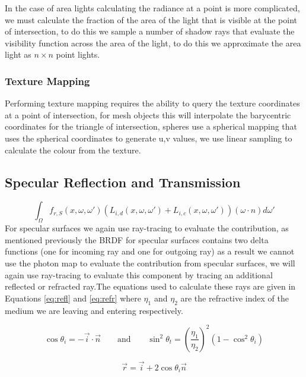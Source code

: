 In the case of area lights calculating the radiance at a point is more complicated, we must calculate the fraction of the
area of the light that is visible at the point of intersection, to do this we sample a number of shadow rays that evaluate the
visibility function across the area of the light, to do this we approximate the area light as $n \times n$ point lights.



\subsubsection{Texture Mapping}
Performing texture mapping requires the ability to query the texture coordinates at a point of intersection, for mesh objects this
will interpolate the barycentric coordinates for the triangle of intersection, spheres use a spherical mapping that uses the
spherical coordinates to generate u,v values, we use linear sampling to calculate the colour from the texture.

\subsection{Specular Reflection and Transmission}
\begin{equation*}
	\int_{\Omega}
	f_{r,S}(x, \omega, \omega')
	(
		L_{i,d}(x,\omega,\omega')
		+
		L_{i,c}(x,\omega,\omega')
	)
	(\omega \cdot n)d\omega'
\end{equation*}
For specular surfaces we again use ray-tracing to evaluate the contribution, as mentioned previously the BRDF for specular surfaces
contains two delta functions (one for incoming ray and one for outgoing ray) as a result we cannot use the photon map to evaluate
the contribution from specular surfaces, we will again use ray-tracing to evaluate this component by tracing an additional reflected
or refracted ray.The equations used to calculate these rays are given in Equations \eqref{eq:refl} and \eqref{eq:refr} where
$\eta_1$ and $\eta_2$ are the refractive index of the medium we are leaving and entering respectively.

\begin{equation}
\cos{\theta_i} = - \vec{i} \cdot \vec{n}
\qquad\text{and}\qquad
\sin^2\theta_t = \left(\frac{\eta_1}{\eta_2}\right)^2(1 - \cos^2\theta_i)
\end{equation}

\begin{equation}
\vec{r} = \vec{i} + 2 \cos{\theta_i} \vec{n}
\label{eq:refl}
\end{equation}

